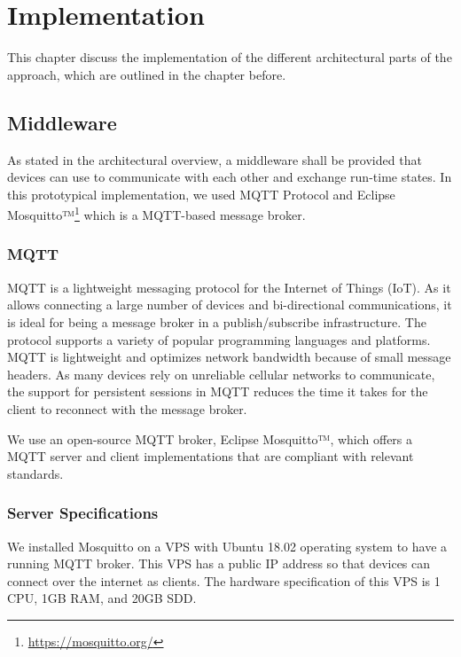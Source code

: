 \chapter{Implementation}
This chapter discuss the implementation of the different architectural parts of the approach, which are outlined in the chapter before.

\label{ch:implementation}
\section{Middleware}
As stated in the architectural overview, a middleware shall be provided that devices can use to communicate with each other and exchange run-time states. In this prototypical implementation, we used MQTT Protocol and Eclipse Mosquitto™\footnote{\url{https://mosquitto.org/}} which is a MQTT-based message broker.

\subsection{MQTT}
MQTT is a lightweight messaging protocol for the Internet of Things (IoT). As it allows connecting a large number of devices and bi-directional communications, it is ideal for being a message broker in a publish/subscribe infrastructure. The protocol supports a variety of popular programming languages and platforms\cite{mqtt}. MQTT is lightweight and optimizes network bandwidth because of small message headers. As many devices rely on unreliable cellular networks to communicate, the support for persistent sessions in MQTT reduces the time it takes for the client to reconnect with the message broker.

We use an open-source MQTT broker, Eclipse Mosquitto™, which offers a MQTT server and client implementations that are compliant with relevant standards.
\cite{mosquitto}

\subsection{Server Specifications}
We installed Mosquitto on a VPS with Ubuntu 18.02 operating system to have a running MQTT broker. This VPS has a public IP address so that devices can connect over the internet as clients. The hardware specification of this VPS is 1 CPU, 1GB RAM, and 20GB SDD. 

